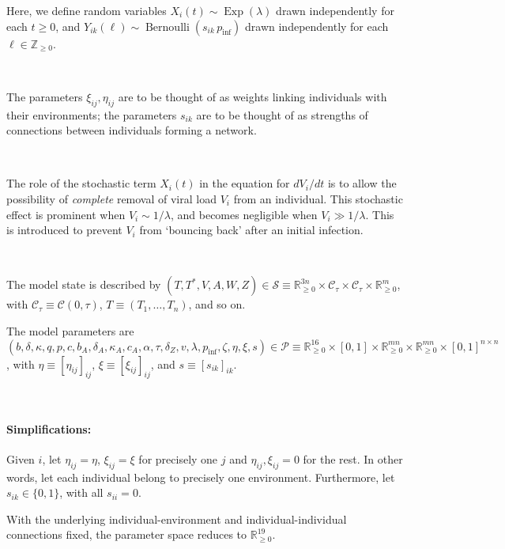 \documentclass[11pt]{article}
\begin{document}
    Here, we define random variables $X_i(t) \sim
    \operatorname{Exp}(\lambda)$ drawn independently for each $t \geq 0$, and
    $Y_{ik}(\ell) \sim \operatorname{Bernoulli}(s_{ik} \, p_\text{inf})$ drawn
    independently for each $\ell \in \mathbb{Z}_{\geq 0}$.

    ~

    The parameters $\xi_{ij}, \eta_{ij}$ are to be thought of as weights
    linking individuals with their environments; the parameters $s_{ik}$ are
    to be thought of as strengths of connections between individuals forming a
    network.

    ~

    The role of the stochastic term $X_i(t)$ in the equation for $dV_i / dt$
    is to allow the possibility of \textit{complete} removal of viral load
    $V_i$ from an individual. This stochastic effect is prominent when $V_i
    \sim 1/\lambda$, and becomes negligible when $V_i \gg 1 / \lambda$.  This
    is introduced to prevent $V_i$ from `bouncing back' after an initial
    infection.

    ~

    The model state is described by $(T, T^*, V, A, W, Z) \in \mathcal{S}
    \equiv \mathbb{R}_{\geq 0}^{3n} \times \mathcal{C}_\tau \times
    \mathcal{C}_\tau \times \mathbb{R}_{\geq 0}^{m}$, with $\mathcal{C}_\tau
    \equiv \mathcal{C}(0, \tau)$, $T \equiv (T_1, \dots, T_n)$, and so on.

    The model parameters are $(b, \delta, \kappa, q, p, c, b_A, \delta_A,
    \kappa_A, c_A, \alpha, \tau, \delta_Z, v, \lambda, p_\text{inf}, \zeta,
    \eta, \xi, s) \in \mathcal{P} \equiv \mathbb{R}_{\geq 0}^{16} \times
    [0, 1] \times \mathbb{R}_{\geq 0}^{mn} \times \mathbb{R}_{\geq 0}^{mn}
    \times [0, 1]^{n\times n}$, with $\eta \equiv [\eta_{ij}]_{ij}$, $\xi
    \equiv [\xi_{ij}]_{ij}$, and $s \equiv [s_{ik}]_{ik}$.

    ~

    \paragraph{Simplifications:} Given $i$, let $\eta_{ij} = \eta$, $\xi_{ij}
    = \xi$ for precisely one $j$ and $\eta_{ij}, \xi_{ij} = 0$ for the rest.
    In other words, let each individual belong to precisely one environment.
    Furthermore, let $s_{ik} \in \{0, 1\}$, with all $s_{ii} = 0$.

    With the underlying individual-environment and individual-individual
    connections fixed, the parameter space reduces to $\mathbb{R}_{\geq
    0}^{19}$.
\end{document}
